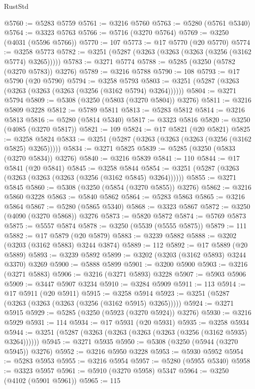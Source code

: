 \begin{lexlean}{RustStd}
\begin{coremodule}
@5760 := @5283 @5759
@5761 := @3216 @5760
@5763 := @5280 (@5761 @5340)
@5764 := @3323 @5763
@5766 := @5716 (@3270 @5764)
@5769 := @3250 (@4031 (@5596 @5766))
@5770 := 107
@5773 := @17 @5770 (@20 @5770)
@5774 := @3258 @5773
@5782 := @3251 (@5287 (@3263 (@3263 (@3263 (@3256 (@3162 @5774) @3265)))))
@5783 := @3271 @5774
@5788 := @5285 (@3250 (@5782 (@3270 @5783)) @3276)
@5789 := @3216 @5788
@5790 := 108
@5793 := @17 @5790 (@20 @5790)
@5794 := @3258 @5793
@5803 := @3251 (@5287 (@3263 (@3263 (@3263 (@3263 (@3256 (@3162 @5794) @3264))))))
@5804 := @3271 @5794
@5809 := @5308 (@3250 (@5803 (@3270 @5804)) @3276)
@5811 := @3216 @5809 @3228
@5812 := @5789 @5811
@5813 := @5283 @5812
@5814 := @3216 @5813
@5816 := @5280 (@5814 @5340)
@5817 := @3323 @5816
@5820 := @3250 (@4085 (@3270 @5817))
@5821 := 109
@5824 := @17 @5821 (@20 @5821)
@5825 := @3258 @5824
@5833 := @3251 (@5287 (@3263 (@3263 (@3263 (@3256 (@3162 @5825) @3265)))))
@5834 := @3271 @5825
@5839 := @5285 (@3250 (@5833 (@3270 @5834)) @3276)
@5840 := @3216 @5839
@5841 := 110
@5844 := @17 @5841 (@20 @5841)
@5845 := @3258 @5844
@5854 := @3251 (@5287 (@3263 (@3263 (@3263 (@3263 (@3256 (@3162 @5845) @3264))))))
@5855 := @3271 @5845
@5860 := @5308 (@3250 (@5854 (@3270 @5855)) @3276)
@5862 := @3216 @5860 @3228
@5863 := @5840 @5862
@5864 := @5283 @5863
@5865 := @3216 @5864
@5867 := @5280 (@5865 @5340)
@5868 := @3323 @5867
@5872 := @3250 (@4090 (@3270 @5868)) @3276
@5873 := @5820 @5872
@5874 := @5769 @5873
@5875 := @5557 @5874
@5878 := @3250 (@5539 (@5555 @5875))
@5879 := 111
@5882 := @17 @5879 (@20 @5879)
@5883 := @3239 @5882
@5888 := @3202 (@3203 (@3162 @5883) @3244 @3874)
@5889 := 112
@5892 := @17 @5889 (@20 @5889)
@5893 := @3239 @5892
@5899 := @3202 (@3203 (@3162 @5893) @3244 @3370) @3269
@5900 := @5888 @5899
@5901 := @3200 @5900
@5903 := @3216 (@3271 @5883)
@5906 := @3216 (@3271 @5893) @3228
@5907 := @5903 @5906
@5909 := @3447 @5907 @3234
@5910 := @3284 @5909
@5911 := 113
@5914 := @17 @5911 (@20 @5911)
@5915 := @3258 @5914
@5923 := @3251 (@5287 (@3263 (@3263 (@3263 (@3256 (@3162 @5915) @3265)))))
@5924 := @3271 @5915
@5929 := @5285 (@3250 (@5923 (@3270 @5924)) @3276)
@5930 := @3216 @5929
@5931 := 114
@5934 := @17 @5931 (@20 @5931)
@5935 := @3258 @5934
@5944 := @3251 (@5287 (@3263 (@3263 (@3263 (@3263 (@3256 (@3162 @5935) @3264))))))
@5945 := @3271 @5935
@5950 := @5308 (@3250 (@5944 (@3270 @5945)) @3276)
@5952 := @3216 @5950 @3228
@5953 := @5930 @5952
@5954 := @5283 @5953
@5955 := @3216 @5954
@5957 := @5280 (@5955 @5340)
@5958 := @3323 @5957
@5961 := @5910 (@3270 @5958) @5347
@5964 := @3250 (@4102 (@5901 @5961))
@5965 := 115

\end{coremodule}
\end{lexlean}
